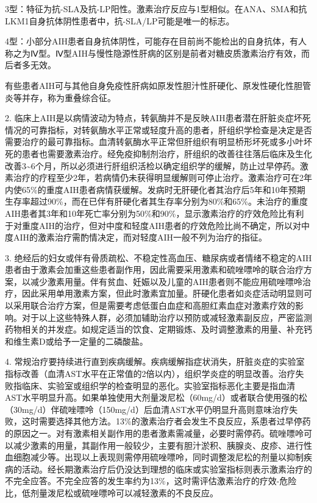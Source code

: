 3型：特征为抗-SLA及抗-LP阳性。激素治疗反应与1型相似。在ANA、SMA和抗LKM1自身抗体阴性患者中，抗-SLA/LP可能是唯一的标志。

4型：小部分AIH患者自身抗体阴性，可能存在目前尚不能检出的自身抗体，有人称之为Ⅳ型。Ⅳ型AIH与慢性隐源性肝病的区别是前者对糖皮质激素治疗有效，而后者多无效。

有些患者AIH可与其他自身免疫性肝病如原发性胆汁性肝硬化、原发性硬化性胆管炎等并存，称为重叠综合征。

2.
临床上AIH是以病情波动为特点，转氨酶并不是反映AIH患者潜在肝脏炎症坏死情况的可靠指标，对转氨酶水平正常或轻度升高的患者，肝组织学检查是决定是否需要治疗的最可靠指标。血清转氨酶水平正常但肝组织有明显桥形坏死或多小叶坏死的患者也需要激素治疗。经免疫抑制剂治疗，肝组织的改善往往落后临床及生化改善3\textasciitilde{}6个月，所以必须进行肝组织活检以确定组织学的缓解，防止过早停药。激素治疗的疗程至少2年，若病情仍未获得明显缓解则可停止治疗。激素治疗可在2年内使65\%的重度AIH患者病情获缓解。发病时无肝硬化者其治疗后5年和10年预期生存率超过90\%，而在已伴有肝硬化者其生存率分别为80\%和65\%。未治疗的重度AIH患者其3年和10年死亡率分别为50\%和90\%，显示激素治疗的疗效危险比有利于对重度AIH的治疗，但对中度和轻度AIH患者的疗效危险比尚不确定，所以对中度AIH的激素治疗需酌情决定，而对轻度AIH一般不列为治疗的指征。

3.
绝经后的妇女或伴有骨质疏松、不稳定性高血压、糖尿病或者情绪不稳定的AIH患者由于激素会加重这些患者副作用，因此需要采用激素和硫唑嘌呤的联合治疗方案，以减少激素用量。伴有贫血、妊娠以及儿童的AIH患者则不能应用硫唑嘌呤治疗，因此采用单用激素方案，但此时激素宜加量。肝硬化患者如炎症活动明显则可以采用联合治疗方案，但是需要考虑低蛋白血症和高胆红素血症对激素疗效的影响。对于以上这些特殊人群，必须加辅助治疗以预防或减轻激素副反应，严密监测药物相关的并发症。如规定适当的饮食、定期锻炼、及时调整激素的用量、补充钙和维生素D或给予一定量的二磷酸盐。

4.
常规治疗要持续进行直到疾病缓解。疾病缓解指症状消失，肝脏炎症的实验室指标改善（血清AST水平在正常值的2倍以内），组织学炎症的明显改善。治疗失败指临床、实验室或组织学的检查明显的恶化。实验室指标恶化主要是指血清AST水平明显升高。如果单独使用大剂量泼尼松（60mg/d）或者联合使用强的松（30mg/d）伴硫唑嘌呤（150mg/d）后血清AST水平仍明显升高则意味治疗失败，这时需要选择其他方法。13\%的激素治疗者会发生不良反应，系患者过早停药的原因之一。对有激素相关副作用的患者激素需减量，必要时需停药。硫唑嘌呤可以减少激素的用量，其副作用一般较少，主要有胆汁淤积、胰腺炎、皮疹、进行性血细胞减少等。出现以上表现则需停用硫唑嘌呤，同时调整泼尼松的剂量以抑制疾病的活动。经长期激素治疗后仍没达到理想的临床或实验室指标则表示激素治疗的不完全应答。不完全应答的发生率约为13\%，这时需评估激素治疗的疗效-危险比，低剂量泼尼松或硫唑嘌呤可以减轻激素的不良反应。

